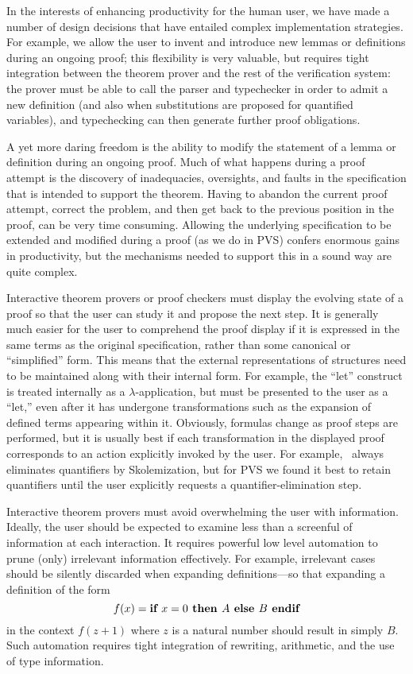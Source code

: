 In the interests of enhancing productivity for the human user, we have
made a number of design decisions that have entailed complex
implementation strategies.  For example, we allow the user to invent
and introduce new lemmas or definitions during an ongoing proof; this
flexibility is very valuable, but requires tight integration between
the theorem prover and the rest of the verification system: the prover
must be able to call the parser and typechecker in order to admit a
new definition (and also when substitutions are proposed for
quantified variables), and typechecking can then generate further
proof obligations.

A yet more daring freedom is the ability to modify the statement of a
lemma or definition during an ongoing proof.  Much of what happens
during a proof attempt is the discovery of inadequacies, oversights,
and faults in the specification that is intended to support the
theorem.  Having to abandon the current proof attempt, correct the
problem, and then get back to the previous position in the proof, can
be very time consuming.  Allowing the underlying specification to be
extended and modified during a proof (as we do in PVS) confers
enormous gains in productivity, but the mechanisms needed to support
this in a sound way are quite complex.

Interactive theorem provers or proof checkers must display the
evolving state of a proof so that the user can study it and propose
the next step.  It is generally much easier for the user to
comprehend the proof display if it is expressed in the same terms as the
original specification, rather than some canonical or ``simplified''
form.  This means that the external representations of structures
need to be maintained along with their internal form.  For example,
the ``let'' construct is treated internally as a
$\lambda$-application, but must be presented to the user as a
``let,'' even after it has undergone transformations such as the
expansion of defined terms appearing within it.  Obviously, formulas
change as proof steps are performed, but it is usually best if each
transformation in the displayed proof corresponds to an action
explicitly invoked by the user.  For example, \ehdm\ always
eliminates quantifiers by Skolemization, but for PVS we found it best
to retain quantifiers until the user explicitly requests a
quantifier-elimination step.

Interactive theorem provers must avoid overwhelming the user with
information.  Ideally, the user should be expected to examine less
than a screenful of information at each interaction.  It requires
powerful low level automation to prune (only) irrelevant information
effectively.  For example, irrelevant cases should be silently
discarded when expanding definitions---so that expanding a definition
of the form \[f(x) = \mbox{\bf if\ } x=0 \mbox{\bf \ then } A \mbox{\bf \ else } B \mbox{\bf \ endif}\] in the
context $f(z+1)$ where $z$ is a natural number should result in
simply $B$.   Such automation requires tight integration of
rewriting, arithmetic, and the use of type information.

